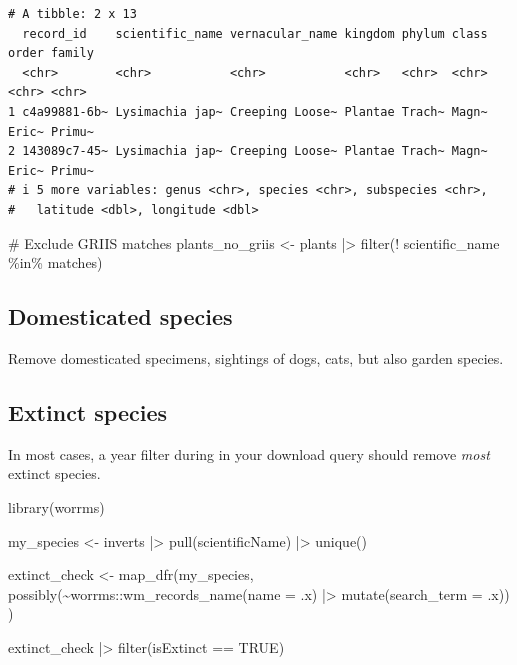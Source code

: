 \documentclass[
  letterpaper,
  DIV=11,
  numbers=noendperiod,
  oneside]{scrreprt}
\newenvironment{Shaded}{\begin{snugshade}}{\end{snugshade}}
\newcommand{\AttributeTok}[1]{\textcolor[rgb]{0.40,0.45,0.13}{#1}}
\newcommand{\CommentTok}[1]{\textcolor[rgb]{0.37,0.37,0.37}{#1}}
\newcommand{\ConstantTok}[1]{\textcolor[rgb]{0.56,0.35,0.01}{#1}}
\newcommand{\FunctionTok}[1]{\textcolor[rgb]{0.28,0.35,0.67}{#1}}
\newcommand{\NormalTok}[1]{\textcolor[rgb]{0.00,0.23,0.31}{#1}}
\newcommand{\OtherTok}[1]{\textcolor[rgb]{0.00,0.23,0.31}{#1}}
\newcommand{\SpecialCharTok}[1]{\textcolor[rgb]{0.37,0.37,0.37}{#1}}
\begin{document}
\begin{verbatim}
# A tibble: 2 x 13
  record_id    scientific_name vernacular_name kingdom phylum class order family
  <chr>        <chr>           <chr>           <chr>   <chr>  <chr> <chr> <chr> 
1 c4a99881-6b~ Lysimachia jap~ Creeping Loose~ Plantae Trach~ Magn~ Eric~ Primu~
2 143089c7-45~ Lysimachia jap~ Creeping Loose~ Plantae Trach~ Magn~ Eric~ Primu~
# i 5 more variables: genus <chr>, species <chr>, subspecies <chr>,
#   latitude <dbl>, longitude <dbl>
\end{verbatim}

\begin{Shaded}
\begin{Highlighting}[]
\CommentTok{\# Exclude GRIIS matches}
\NormalTok{plants\_no\_griis }\OtherTok{\textless{}{-}}\NormalTok{ plants }\SpecialCharTok{|\textgreater{}} \FunctionTok{filter}\NormalTok{(}\SpecialCharTok{!}\NormalTok{ scientific\_name }\SpecialCharTok{\%in\%}\NormalTok{ matches)}
\end{Highlighting}
\end{Shaded}

\hypertarget{domesticated-species}{%
\subsection{Domesticated species}\label{domesticated-species}}

Remove domesticated specimens, sightings of dogs, cats, but also garden
species.

\hypertarget{extinct-species}{%
\subsection{Extinct species}\label{extinct-species}}

In most cases, a year filter during in your download query should remove
\emph{most} extinct species.

\begin{Shaded}
\begin{Highlighting}[]
\FunctionTok{library}\NormalTok{(worrms)}

\NormalTok{my\_species }\OtherTok{\textless{}{-}}\NormalTok{ inverts }\SpecialCharTok{|\textgreater{}} 
  \FunctionTok{pull}\NormalTok{(scientificName) }\SpecialCharTok{|\textgreater{}}
  \FunctionTok{unique}\NormalTok{()}

\NormalTok{extinct\_check }\OtherTok{\textless{}{-}} \FunctionTok{map\_dfr}\NormalTok{(my\_species,}
       \FunctionTok{possibly}\NormalTok{(}\SpecialCharTok{\textasciitilde{}}\NormalTok{worrms}\SpecialCharTok{::}\FunctionTok{wm\_records\_name}\NormalTok{(}\AttributeTok{name =}\NormalTok{ .x) }\SpecialCharTok{|\textgreater{}} \FunctionTok{mutate}\NormalTok{(}\AttributeTok{search\_term =}\NormalTok{ .x))}
\NormalTok{)}

\NormalTok{extinct\_check }\SpecialCharTok{|\textgreater{}} \FunctionTok{filter}\NormalTok{(isExtinct }\SpecialCharTok{==} \ConstantTok{TRUE}\NormalTok{)}
\end{Highlighting}
\end{Shaded}
\end{document}
